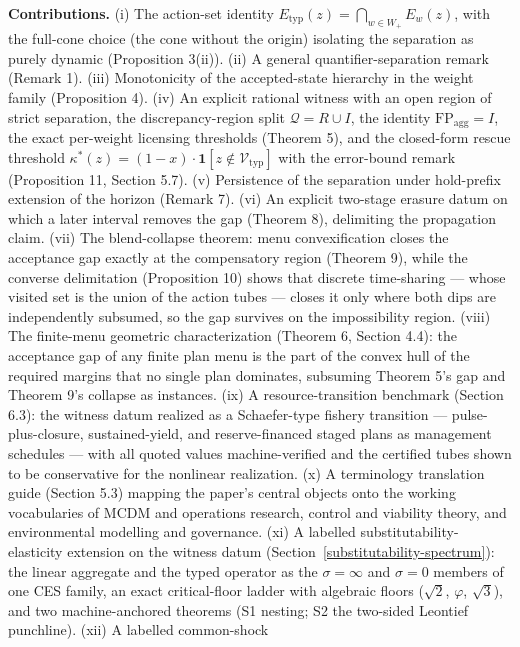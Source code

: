 \documentclass[3p,11pt]{elsarticle}
\begin{document}
\textbf{Contributions.} (i) The action-set identity \(E_{\mathrm{typ}}(z) = \bigcap_{w \in W_+} E_w(z)\), with the full-cone
choice (the cone without the origin) isolating the separation as purely
dynamic (Proposition 3(ii)). (ii) A general quantifier-separation remark
(Remark 1). (iii) Monotonicity of the accepted-state hierarchy in the
weight family (Proposition 4). (iv) An explicit rational witness with an
open region of strict separation, the discrepancy-region split
\(\mathcal{Q} = R \cup I\), the identity
\(\mathrm{FP}_{\mathrm{agg}} = I\), the exact per-weight licensing thresholds (Theorem 5), and the closed-form rescue threshold \(\kappa^*(z) = (1 - x)\cdot\mathbf{1}[z \notin \mathcal{V}_{\mathrm{typ}}]\) with the error-bound remark (Proposition 11, Section 5.7). (v) Persistence of the separation under
hold-prefix extension of the horizon (Remark 7). (vi) An explicit
two-stage erasure datum on which a later interval removes the gap
(Theorem 8), delimiting the propagation claim. (vii) The blend-collapse
theorem: menu convexification closes the acceptance gap exactly at the compensatory region (Theorem 9), while the converse
delimitation (Proposition 10) shows that discrete time-sharing --- whose
visited set is the union of the action tubes --- closes it only where
both dips are independently subsumed, so the gap survives on the
impossibility region. (viii) The finite-menu geometric characterization
(Theorem 6, Section 4.4): the acceptance gap of any finite plan menu is
the part of the convex hull of the required margins that no single plan
dominates, subsuming Theorem 5's gap and Theorem 9's collapse as
instances. (ix) A resource-transition benchmark
(Section 6.3): the witness datum realized as a Schaefer-type fishery
transition --- pulse-plus-closure, sustained-yield, and reserve-financed
staged plans as management schedules --- with all quoted values
machine-verified and the certified tubes shown to be conservative for the
nonlinear realization. (x) A terminology translation guide (Section 5.3)
mapping the paper's central objects onto the working vocabularies of MCDM
and operations research, control and viability theory, and environmental
modelling and governance. (xi) A labelled substitutability-elasticity
extension on the witness datum (Section~\ref{substitutability-spectrum}):
the linear aggregate and the typed operator as the \(\sigma = \infty\)
and \(\sigma = 0\) members of one CES family, an exact critical-floor
ladder with algebraic floors (\(\sqrt{2}\), \(\varphi\),
\(\sqrt{3}\)), and two machine-anchored theorems (S1 nesting; S2 the
two-sided Leontief punchline). (xii) A labelled common-shock
\end{document}
